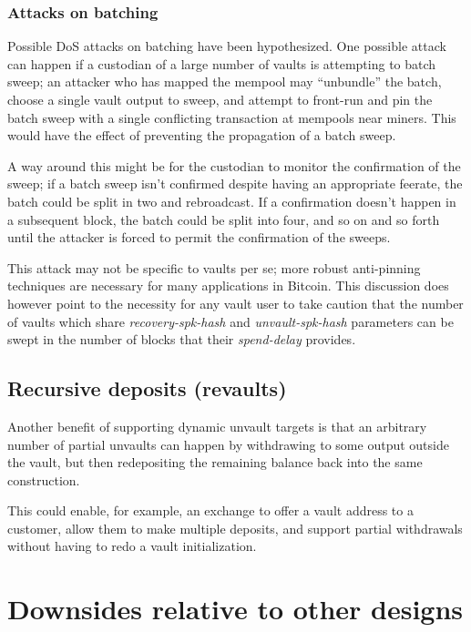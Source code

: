 \documentclass[10pt]{article}
\begin{document}
\subsubsection*{Attacks on batching}

Possible DoS attacks on batching have been hypothesized. One possible attack can happen
if a custodian of a large number of vaults is attempting to batch sweep;
an attacker who has mapped the mempool may ``unbundle'' the batch, choose a single
vault output to sweep, and attempt to front-run and pin the batch sweep with a single
conflicting transaction at mempools near miners. This would have the effect of
preventing the propagation of a batch sweep.

A way around this might be for the custodian to monitor the confirmation of the sweep;
if a batch sweep isn't confirmed despite having an appropriate feerate, the batch
could be split in two and rebroadcast. If a confirmation doesn't happen in a subsequent
block, the batch could be split into four, and so on and so forth until the attacker is
forced to permit the confirmation of the sweeps.

This attack may not be specific to vaults per se; more robust anti-pinning techniques
are necessary for many applications in Bitcoin. This discussion
does however point to the necessity for any vault user to take caution that the
number of vaults which share \emph{recovery-spk-hash} and \emph{unvault-spk-hash}
parameters can be swept in the number of blocks that their \emph{spend-delay}
provides.

\subsection*{Recursive deposits (revaults)}

Another benefit of supporting dynamic unvault targets is that an arbitrary number of
partial unvaults can happen by withdrawing to some output outside the vault, but then
redepositing the remaining balance back into the same  
construction.

This could enable, for example, an exchange to offer a vault address to a customer,
allow them to make multiple deposits, and support partial withdrawals without having to
redo a vault initialization.

\section*{Downsides relative to other designs}
\end{document}
